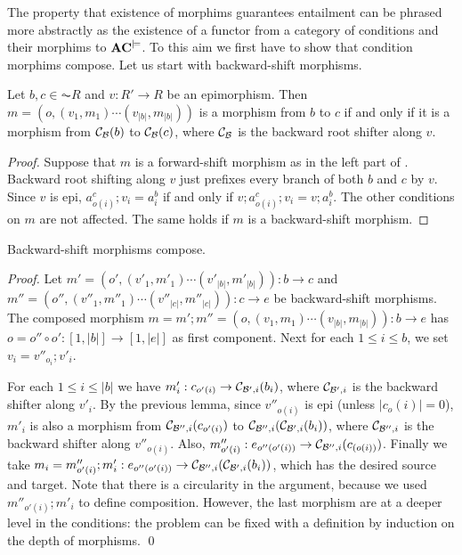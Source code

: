 The property that existence of morphims guarantees entailment can be phrased more abstractly as the existence of a functor from a category of conditions and their morphims to $\mathbf{AC}^{\models}$. To this aim we first have to show that condition morphims compose. Let us start with backward-shift morphisms.

\begin{lemma}
Let $b,c \in  \AC{R}$ and $v: R' \to R$ be an epimorphism. Then $m = (o,(v_1,m_1)\cdots(v_{|b|},m_{|b|}))$ is a morphism from $b$ to $c$ if and only if it is a morphism from $\mathcal{C}_{\mathcal{B}}(b)$ to $\mathcal{C}_{\mathcal{B}}(c)$, where $\mathcal{C}_{\mathcal{B}}$ is the backward root shifter along $v$. 
\end{lemma}

\begin{proof}
  Suppose that $m$ is a forward-shift morphism as 
  in the left part of . Backward root shifting along $v$ just prefixes every branch of both $b$ and $c$ by $v$. Since $v$ is epi, $a^c_{o(i)} ; v_i = a^b_i$ if and only if $v; a^c_{o(i)} ; v_i = v; a^b_i$. The other conditions on $m$ are not affected.  The same holds if $m$ is a backward-shift morphism.
\end{proof}
  
\begin{lemma}
  Backward-shift morphisms compose.
\end{lemma}
\begin{proof}
Let $m' = (o',(v'_1,m'_1)\cdots(v'_{|b|},m'_{|b|})): b \to c$ and 
$m'' = (o'',(v''_1,m''_1)\cdots(v''_{|c|},m''_{|c|})): c \to e$ be backward-shift morphisms.  The composed morphism $m = m' ; m'' = (o,(v_1,m_1)\cdots(v_{|b|},m_{|b|})): b \to e$ has $o = o'' \circ o': [1,|b|] \to [1,|e|]$ as first component. Next for each $1\leq i \leq b$, we set $v_i = v''_{o_i} ; v'_i$.  

For each $1\leq i \leq |b|$ we have $m'_i: c_{o'(i)} \to \mathcal{C}_{\mathcal{B}',i}(b_i)$, where $\mathcal{C}_{\mathcal{B}',i}$ is the backward shifter along $v'_i$. 
By the previous lemma, since $v''_{o(i)}$ is epi (unless $|c_o(i)| = 0$),  $m'_i$ is also a morphism from $\mathcal{C}_{\mathcal{B}'',i}(c_{o'(i)})$  to $\mathcal{C}_{\mathcal{B}'',i}(\mathcal{C}_{\mathcal{B}',i}(b_i))$, where $\mathcal{C}_{\mathcal{B}'',i}$ is the backward shifter along $v''_{o(i)}$. Also, $m''_{o'(i)}: e_{o''(o'(i))} \to \mathcal{C}_{\mathcal{B}'',i}(c_{(o(i))})$. Finally we take $m_i = m''_{o'(i)}; m'_i : e_{o''(o'(i))} \to \mathcal{C}_{\mathcal{B}'',i}(\mathcal{C}_{\mathcal{B}',i}(b_i))$, which has the desired source and target. Note that there is a circularity in the argument, because we used $m''_{o'(i)}; m'_i$ to define composition. However, the last morphism are at a deeper level in the conditions: the problem can be fixed with a definition by induction on the depth of morphisms.  \qed
\end{proof}

